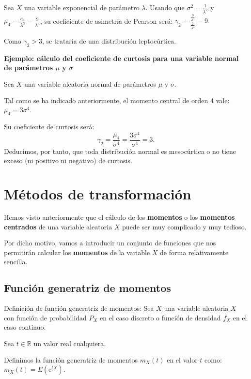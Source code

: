 \documentclass[]{book}
\begin{document}
Sea \(X\) una variable exponencial de parámetro \(\lambda\).
Usando que \(\sigma^2=\frac{1}{\lambda^2}\) y \(\mu_4 =\frac{a_4}{\lambda^3}=\frac{9}{\lambda^4}\), su coeficiente de asimetría de Pearson será:
\(\gamma_2 = \frac{\frac{9}{\lambda^4}}{\frac{1}{\lambda^4}}=9.\)

Como \(\gamma_2 >3\), se trataría de una distribución leptocúrtica.

\textbf{Ejemplo: cálculo del coeficiente de curtosis para una variable normal de parámetros \(\mu\) y \(\sigma\)}

Sea \(X\) una variable aleatoria normal de parámetros \(\mu\) y \(\sigma\).

Tal como se ha indicado anteriormente, el momento central de orden 4 vale: \(\mu_4 = 3\sigma^4\).

Su coeficiente de curtosis será:
\[
\gamma_2 =\frac{\mu_4}{\sigma^4}=\frac{3\sigma^4}{\sigma^4}=3.
\]
Deducimos, por tanto, que toda distribución normal es mesocúrtica o no tiene exceso (ni positivo ni negativo) de curtosis.

\hypertarget{muxe9todos-de-transformaciuxf3n}{%
\section{Métodos de transformación}\label{muxe9todos-de-transformaciuxf3n}}

Hemos visto anteriormente que el cálculo de los \textbf{momentos} o los \textbf{momentos centrados} de una variable aleatoria \(X\) puede ser muy complicado y muy tedioso.

Por dicho motivo, vamos a introducir un conjunto de funciones que nos permitirán calcular los \textbf{momentos} de la variable \(X\) de forma relativamente sencilla.

\hypertarget{funciuxf3n-generatriz-de-momentos}{%
\subsection{Función generatriz de momentos}\label{funciuxf3n-generatriz-de-momentos}}

Definición de función generatriz de momentos:
Sea \(X\) una variable aleatoria \(X\) con función de probabilidad \(P_X\) en el caso discreto o función
de densidad \(f_X\) en el caso continuo.

Sea \(t\in\mathbb{R}\) un valor real cualquiera.

Definimos la función generatriz de momentos \(m_X(t)\) en el valor \(t\) como: \(m_X(t)=E\left(\mathrm{e}^{tX}\right).\)
\end{document}
